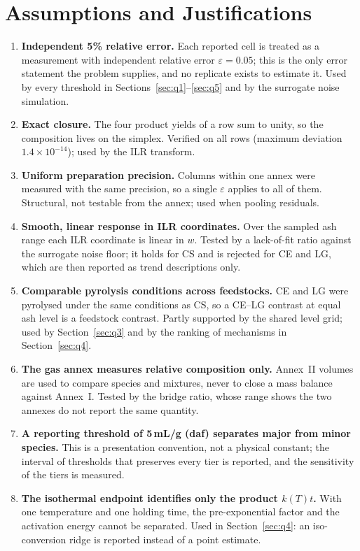 \documentclass[withoutpreface,bwprint]{apmcmthesis}
\begin{document}
\section{Assumptions and Justifications}
\begin{enumerate}
\item \textbf{Independent 5\% relative error.} Each reported cell is treated as a measurement with independent relative error $\varepsilon=0.05$; this is the only error statement the problem supplies, and no replicate exists to estimate it. Used by every threshold in Sections~\ref{sec:q1}--\ref{sec:q5} and by the surrogate noise simulation.
\item \textbf{Exact closure.} The four product yields of a row sum to unity, so the composition lives on the simplex. Verified on all rows (maximum deviation $1.4\times10^{-14}$); used by the ILR transform.
\item \textbf{Uniform preparation precision.} Columns within one annex were measured with the same precision, so a single $\varepsilon$ applies to all of them. Structural, not testable from the annex; used when pooling residuals.
\item \textbf{Smooth, linear response in ILR coordinates.} Over the sampled ash range each ILR coordinate is linear in $w$. Tested by a lack-of-fit ratio against the surrogate noise floor; it holds for CS and is rejected for CE and LG, which are then reported as trend descriptions only.
\item \textbf{Comparable pyrolysis conditions across feedstocks.} CE and LG were pyrolysed under the same conditions as CS, so a CE--LG contrast at equal ash level is a feedstock contrast. Partly supported by the shared level grid; used by Section~\ref{sec:q3} and by the ranking of mechanisms in Section~\ref{sec:q4}.
\item \textbf{The gas annex measures relative composition only.} Annex~II volumes are used to compare species and mixtures, never to close a mass balance against Annex~I. Tested by the bridge ratio, whose range shows the two annexes do not report the same quantity.
\item \textbf{A reporting threshold of 5\,mL/g (daf) separates major from minor species.} This is a presentation convention, not a physical constant; the interval of thresholds that preserves every tier is reported, and the sensitivity of the tiers is measured.
\item \textbf{The isothermal endpoint identifies only the product $k(T)t$.} With one temperature and one holding time, the pre-exponential factor and the activation energy cannot be separated. Used in Section~\ref{sec:q4}: an iso-conversion ridge is reported instead of a point estimate.

\end{enumerate}
\end{document}
